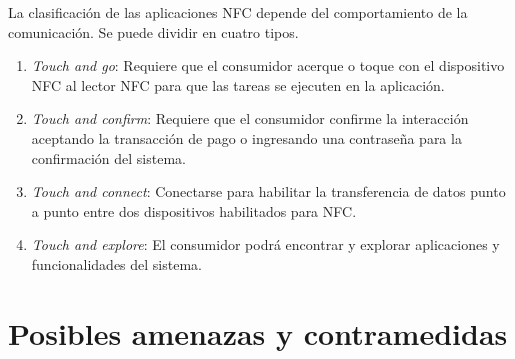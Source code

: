 \documentclass[12pt,a4paper,onecolumn,oneside]{report}
\begin{document}
La clasificación de las aplicaciones NFC depende del comportamiento de la comunicación. Se puede dividir en cuatro tipos.

\begin{enumerate}

\item \textit{Touch and go}: Requiere que el consumidor acerque o toque con el dispositivo NFC al lector NFC para que las tareas se ejecuten en la aplicación. 
\item \textit{Touch and confirm}: Requiere que el consumidor confirme la interacción aceptando la transacción de pago o ingresando una contraseña para la confirmación del sistema.
\item \textit{Touch and connect}: Conectarse para habilitar la transferencia de datos punto a punto entre dos dispositivos habilitados para NFC. 
\item \textit{Touch and explore}: El consumidor podrá encontrar y explorar aplicaciones y funcionalidades del sistema.

\end{enumerate}


\section{Posibles amenazas y contramedidas}
\end{document}
